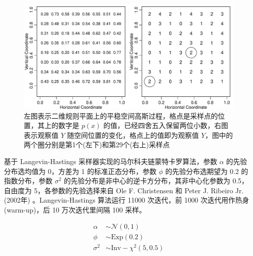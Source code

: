 \documentclass[12pt,a4paper,UTF8,twoside]{book}
\theoremstyle{definition}
\theoremstyle{definition}
\theoremstyle{definition}
\theoremstyle{remark}
\begin{document}
\begin{figure}

{\centering \includegraphics[width=0.9\linewidth]{figures/binom-without-nugget-geoRglm} 

}

\caption{左图表示二维规则平面上的平稳空间高斯过程，格点是采样点的位置，其上的数字是 $p(x)$ 的值，已经四舍五入保留两位小数，右图表示观察值 $Y$ 随空间位置的变化，格点上的值即为观察值 $Y$，图中的两个圈分别是第1个(左下)和第29个(右上)采样点}\label{fig:binom-without-nugget-geoRglm}
\end{figure}

基于 Langevin-Hastings 采样器实现的马尔科夫链蒙特卡罗算法，参数
\(\alpha\) 的先验分布选均值为 0，方差为 1 的标准正态分布，参数 \(\phi\)
的先验分布选期望为 0.2 的指数分布，参数 \(\sigma^2\)
的先验分布是非中心的逆卡方分布，其非中心化参数为 0.5，自由度为
5，各参数的先验选择来自 Ole F. Christensen 和 Peter J. Ribeiro Jr.
(2002年) \citep{geoRglm2002}。Langevin-Hastings 算法运行 11000
次迭代，前 1000 次迭代用作热身 (warm-up)，后 10 万次迭代里间隔 100
采样。

\begin{align}
\alpha   & \sim \mathcal{N}(0,1) \\
\phi     & \sim \mathrm{Exp}(0.2) \\
\sigma^2 & \sim \mathrm{Inv-}\chi^2(5,0.5)
\end{align}
\end{document}
